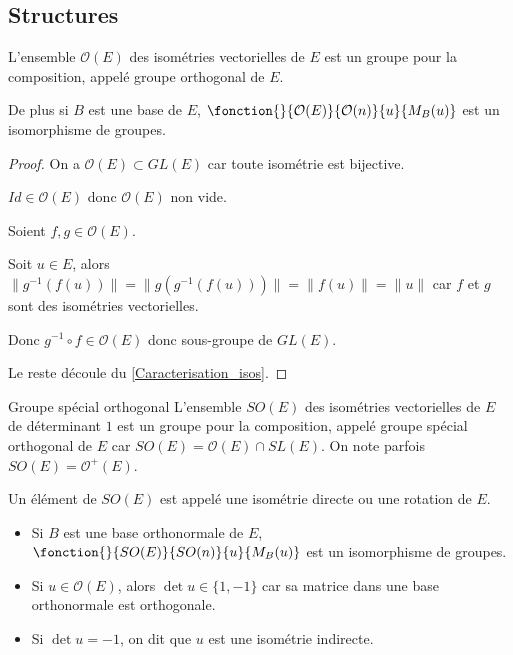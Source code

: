 \subsection{Structures}

\begin{proposition}{}{}
    L'ensemble $\mathcal O(E)$ des isométries vectorielles de $E$ est un groupe pour la composition, 
    appelé groupe orthogonal de $E$.

    De plus si $B$ est une base de $E$, $\fonction{}{\mathcal O(E)}{\mathcal O(n)}{u}{M_B(u)}$ est un isomorphisme de groupes.
\end{proposition}

\begin{proof}
    On a $\mathcal O(E) \subset GL(E)$ car toute isométrie est bijective.

    $Id \in \mathcal O(E)$ donc $\mathcal O(E)$ non vide.

    Soient $f, g \in \mathcal O(E)$. 

    Soit $u \in E$, alors $\| g^{-1} (f(u)) \| = \| g (g^{-1} (f(u))) \| = \| f(u) \| = \| u \|$ 
    car $f$ et $g$ sont des isométries vectorielles. 

    Donc $g^{-1} \circ f \in \mathcal O(E)$ donc sous-groupe de $GL(E)$.

    Le reste découle du \ref{Caracterisation_isos}.
\end{proof}

\begin{definition}{Groupe spécial orthogonal}{}
    L'ensemble $SO(E)$ des isométries vectorielles de $E$ de déterminant $1$ est un groupe 
    pour la composition, appelé groupe spécial orthogonal de $E$ car 
    $SO(E) = \mathcal O(E) \cap SL(E)$.
    On note parfois $SO(E) = \mathcal O^+(E)$. 

    Un élément de $SO(E)$ est appelé une isométrie directe ou une rotation de $E$. 

    \begin{itemize}
        \item Si $B$ est une base orthonormale de $E$, $\fonction{}{SO(E)}{SO(n)}{u}{M_B(u)}$ est un isomorphisme de groupes.
        \item Si $u \in \mathcal O(E)$, alors $\det u \in \{1, -1 \}$ car sa matrice dans une base orthonormale est orthogonale. 
        \item Si $\det u = -1$, on dit que $u$ est une isométrie indirecte. 
    \end{itemize}
\end{definition}

